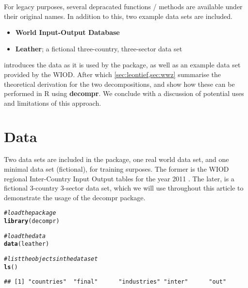 \documentclass[a4paper]{article}\usepackage[]{graphicx}\usepackage[]{color}
\makeatletter
\newcommand{\hlcom}[1]{\textcolor[rgb]{0.678,0.584,0.686}{\textit{#1}}}%
\newcommand{\hlstd}[1]{\textcolor[rgb]{0.345,0.345,0.345}{#1}}%
\newcommand{\hlkwd}[1]{\textcolor[rgb]{0.737,0.353,0.396}{\textbf{#1}}}%
\newenvironment{kframe}{%
 \def\at@end@of@kframe{}%
 \ifinner\ifhmode%
  \def\at@end@of@kframe{\end{minipage}}%
  \begin{minipage}{\columnwidth}%
 \fi\fi%
 \def\FrameCommand##1{\hskip\@totalleftmargin \hskip-\fboxsep
 \colorbox{shadecolor}{##1}\hskip-\fboxsep
     \hskip-\linewidth \hskip-\@totalleftmargin \hskip\columnwidth}%
 \MakeFramed {\advance\hsize-\width
   \@totalleftmargin\z@ \linewidth\hsize
   \@setminipage}}%
 {\par\unskip\endMakeFramed%
 \at@end@of@kframe}
\newenvironment{knitrout}{}{} %
\makeatother
\begin{document}
For legacy purposes, several depracated functions / methods are available under their original names.
In addition to this, two example data sets are included.

\begin{itemize}
  \item \textbf{World Input-Output Database} \parencite{timmer2012world}
  \item \textbf{Leather}; a fictional three-country, three-sector data set
\end{itemize}


 introduces the data as it is used by the package, as well as an example data set provided by the WIOD.
After which \cref{sec:leontief,sec:wwz} summarise the theoretical derivation for the two decompositions, and show how these can be performed in R using \textbf{decompr}.
We conclude with a discussion of potential uses and limitations of this approach.

\section{Data}
\label{sec:data}
Two data sets are included in the package, one real world data set, and one minimal data set (fictional), for training surposes.
The former is the WIOD regional Inter-Country Input Output tables for the year 2011 \parencite{timmer2012world}. 
The later, is a fictional 3-country 3-sector data set, which we will use throughout this article to demonstrate the usage of the decompr package.

\begin{knitrout}
\color{fgcolor}\begin{kframe}
\begin{alltt}
\hlcom{# load the package}
\hlkwd{library}\hlstd{(decompr)}
\end{alltt}
\end{kframe}
\end{knitrout}

\begin{knitrout}
\color{fgcolor}\begin{kframe}
\begin{alltt}
\hlcom{# load the data}
\hlkwd{data}\hlstd{(leather)}

\hlcom{# list the objects in the data set}
\hlkwd{ls}\hlstd{()}
\end{alltt}
\begin{verbatim}
## [1] "countries"  "final"      "industries" "inter"      "out"
\end{verbatim}
\end{kframe}
\end{knitrout}
\end{document}
